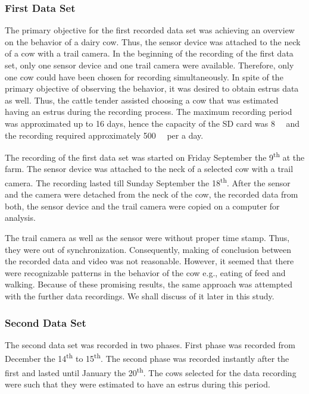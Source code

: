 \documentclass[english,12pt,a4paper,pdftex,elec,utf8]{aaltothesis}
\begin{document}
\subsubsection*{First Data Set} \label{firstdatasetsection}




The primary objective for the first recorded data set was achieving an overview on the behavior of a dairy cow. Thus, the sensor device was attached to the neck of a cow with a trail camera. In the beginning of the recording of the first data set, only one sensor device and one trail camera were available. Therefore, only one cow could have been chosen for recording simultaneously. In spite of the primary objective of observing the behavior, it was desired to obtain estrus data as well. Thus, the cattle tender assisted choosing a cow that was estimated having an estrus during the recording process. The maximum recording period was approximated up to 16 days, hence the capacity of the SD card was \SI{8}{\giga \byte} and the recording required approximately \SI{500}{\mega \byte} per a day.

The recording of the first data set was started on Friday September the 9\textsuperscript{th} at the farm. The sensor device was attached to the neck of a selected cow with a trail camera. The recording lasted till Sunday September the 18\textsuperscript{th}. After the sensor and the camera were detached from the neck of the cow, the recorded data from both, the sensor device and the trail camera were copied on a computer for analysis.

The trail camera as well as the sensor were without proper time stamp. Thus, they were out of synchronization. Consequently, making of conclusion between the recorded data and video was not reasonable. However, it seemed that there were recognizable patterns in the behavior of the cow e.g., eating of feed and walking. Because of these promising results, the same approach was attempted with the further data recordings. We shall discuss of it later in this study.


\subsubsection*{Second Data Set} \label{seconddatasetsection}

The second data set was recorded in two phases. First phase was recorded from December the 14\textsuperscript{th} to 15\textsuperscript{th}. The second phase was recorded instantly after the first and lasted until January the 20\textsuperscript{th}. The cows selected for the data recording were such that they were estimated to have an estrus during this period.
\end{document}
